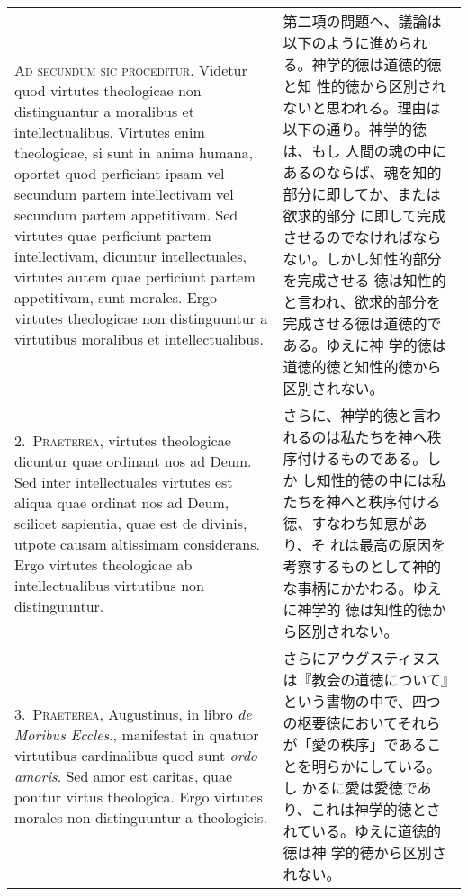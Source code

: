 \documentclass[10pt]{jsarticle}
\begin{document}
\begin{longtable}{p{21em}p{21em}}
{\scshape Ad secundum sic proceditur}. Videtur quod virtutes
theologicae non distinguantur a moralibus et
intellectualibus. Virtutes enim theologicae, si sunt in anima humana,
oportet quod perficiant ipsam vel secundum partem intellectivam vel
secundum partem appetitivam. Sed virtutes quae perficiunt partem
intellectivam, dicuntur intellectuales, virtutes autem quae perficiunt
partem appetitivam, sunt morales. Ergo virtutes theologicae non
distinguuntur a virtutibus moralibus et intellectualibus.

&

 第二項の問題へ、議論は以下のように進められる。神学的徳は道徳的徳と知
 性的徳から区別されないと思われる。理由は以下の通り。神学的徳は、もし
 人間の魂の中にあるのならば、魂を知的部分に即してか、または欲求的部分
 に即して完成させるのでなければならない。しかし知性的部分を完成させる
 徳は知性的と言われ、欲求的部分を完成させる徳は道徳的である。ゆえに神
 学的徳は道徳的徳と知性的徳から区別されない。
 
\\



2.~{\scshape Praeterea}, virtutes theologicae dicuntur quae ordinant
nos ad Deum. Sed inter intellectuales virtutes est aliqua quae ordinat
nos ad Deum, scilicet sapientia, quae est de divinis, utpote causam
altissimam considerans. Ergo virtutes theologicae ab intellectualibus
virtutibus non distinguuntur.


&

 さらに、神学的徳と言われるのは私たちを神へ秩序付けるものである。しか
 し知性的徳の中には私たちを神へと秩序付ける徳、すなわち知恵があり、そ
 れは最高の原因を考察するものとして神的な事柄にかかわる。ゆえに神学的
 徳は知性的徳から区別されない。
 
\\



3.~{\scshape Praeterea}, Augustinus, in libro {\itshape de Moribus
Eccles}., manifestat in quatuor virtutibus cardinalibus quod sunt
{\itshape ordo amoris}. Sed amor est caritas, quae ponitur virtus
theologica. Ergo virtutes morales non distinguuntur a theologicis.

&

 さらにアウグスティヌスは『教会の道徳について』という書物の中で、四つ
 の枢要徳においてそれらが「愛の秩序」であることを明らかにしている。し
 かるに愛は愛徳であり、これは神学的徳とされている。ゆえに道徳的徳は神
 学的徳から区別されない。
 

\end{longtable}
\end{document}
